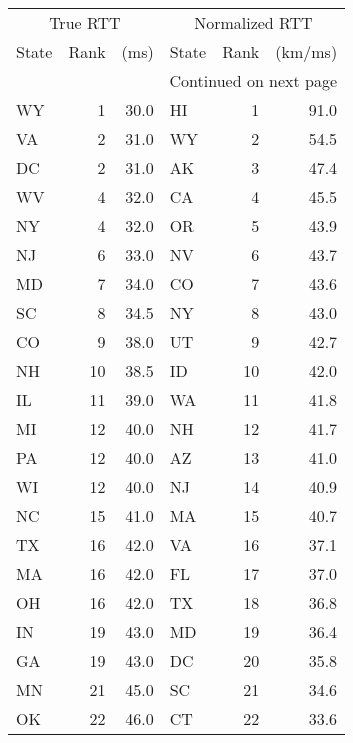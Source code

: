 \begin{longtable}{lrr||lrr}
  \multicolumn{3}{c||}{True RTT} & \multicolumn{3}{c}{Normalized RTT} \\
     State &  Rank & (ms) &      State & Rank & (km/ms) \\
\midrule
\endhead
\midrule
\multicolumn{6}{r}{{Continued on next page}} \\
\midrule
\endfoot
\endlastfoot
        WY &    1 &  30.0 &             HI &    1 &  91.0 \\
        VA &    2 &  31.0 &             WY &    2 &  54.5 \\
        DC &    2 &  31.0 &             AK &    3 &  47.4 \\
        WV &    4 &  32.0 &             CA &    4 &  45.5 \\
        NY &    4 &  32.0 &             OR &    5 &  43.9 \\
        NJ &    6 &  33.0 &             NV &    6 &  43.7 \\
        MD &    7 &  34.0 &             CO &    7 &  43.6 \\
        SC &    8 &  34.5 &             NY &    8 &  43.0 \\
        CO &    9 &  38.0 &             UT &    9 &  42.7 \\
        NH &   10 &  38.5 &             ID &   10 &  42.0 \\
        IL &   11 &  39.0 &             WA &   11 &  41.8 \\
        MI &   12 &  40.0 &             NH &   12 &  41.7 \\
        PA &   12 &  40.0 &             AZ &   13 &  41.0 \\
        WI &   12 &  40.0 &             NJ &   14 &  40.9 \\
        NC &   15 &  41.0 &             MA &   15 &  40.7 \\
        TX &   16 &  42.0 &             VA &   16 &  37.1 \\
        MA &   16 &  42.0 &             FL &   17 &  37.0 \\
        OH &   16 &  42.0 &             TX &   18 &  36.8 \\
        IN &   19 &  43.0 &             MD &   19 &  36.4 \\
        GA &   19 &  43.0 &             DC &   20 &  35.8 \\
        MN &   21 &  45.0 &             SC &   21 &  34.6 \\
        OK &   22 &  46.0 &             CT &   22 &  33.6 \\

\end{longtable}
